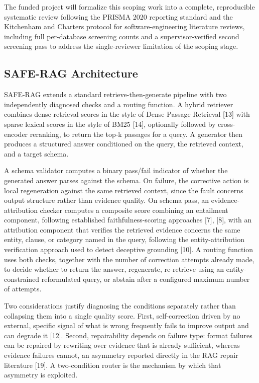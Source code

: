 \documentclass[11pt,a4paper]{article}
\begin{document}
The funded project will formalize this scoping work into a complete, reproducible
systematic review following the PRISMA 2020 reporting standard and the Kitchenham and
Charters protocol for software-engineering literature reviews, including full
per-database screening counts and a supervisor-verified second screening pass to address
the single-reviewer limitation of the scoping stage.

\subsection{SAFE-RAG Architecture}

SAFE-RAG extends a standard retrieve-then-generate pipeline with two independently
diagnosed checks and a routing function. A hybrid retriever combines dense retrieval
scores in the style of Dense Passage Retrieval [13] with sparse lexical scores in the
style of BM25 [14], optionally followed by cross-encoder reranking, to return the top-k
passages for a query. A generator then produces a structured answer conditioned on the
query, the retrieved context, and a target schema.

A schema validator computes a binary pass/fail indicator of whether the generated answer
parses against the schema. On failure, the corrective action is local regeneration
against the same retrieved context, since the fault concerns output structure rather than
evidence quality. On schema pass, an evidence-attribution checker computes a composite
score combining an entailment component, following established faithfulness-scoring
approaches [7], [8], with an attribution component that verifies the retrieved evidence
concerns the same entity, clause, or category named in the query, following the
entity-attribution verification approach used to detect deceptive grounding [10]. A
routing function uses both checks, together with the number of correction attempts
already made, to decide whether to return the answer, regenerate, re-retrieve using an
entity-constrained reformulated query, or abstain after a configured maximum number of
attempts.

Two considerations justify diagnosing the conditions separately rather than collapsing
them into a single quality score. First, self-correction driven by no external, specific
signal of what is wrong frequently fails to improve output and can degrade it [12].
Second, repairability depends on failure type: format failures can be repaired by
rewriting over evidence that is already sufficient, whereas evidence failures cannot, an
asymmetry reported directly in the RAG repair literature [19]. A two-condition router is
the mechanism by which that asymmetry is exploited.
\end{document}
